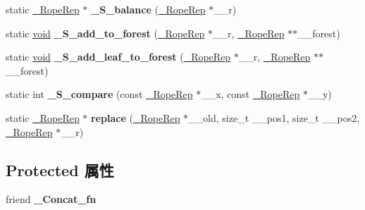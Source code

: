 \begin{DoxyCompactItemize}
\item 
\mbox{\label{classrope_a8bd6a43d37132875ab5318828aac92ee}} 
static \hyperlink{struct___rope___rope_rep}{\+\_\+\+Rope\+Rep} $\ast$ {\bfseries \+\_\+\+S\+\_\+balance} (\hyperlink{struct___rope___rope_rep}{\+\_\+\+Rope\+Rep} $\ast$\+\_\+\+\_\+r)
\item 
\mbox{\label{classrope_afdc31aa8c4716991358e17e7308dadad}} 
static \hyperlink{interfacevoid}{void} {\bfseries \+\_\+\+S\+\_\+add\+\_\+to\+\_\+forest} (\hyperlink{struct___rope___rope_rep}{\+\_\+\+Rope\+Rep} $\ast$\+\_\+\+\_\+r, \hyperlink{struct___rope___rope_rep}{\+\_\+\+Rope\+Rep} $\ast$$\ast$\+\_\+\+\_\+forest)
\item 
\mbox{\label{classrope_ac3317f231f99b11f1a464b59b9192ac0}} 
static \hyperlink{interfacevoid}{void} {\bfseries \+\_\+\+S\+\_\+add\+\_\+leaf\+\_\+to\+\_\+forest} (\hyperlink{struct___rope___rope_rep}{\+\_\+\+Rope\+Rep} $\ast$\+\_\+\+\_\+r, \hyperlink{struct___rope___rope_rep}{\+\_\+\+Rope\+Rep} $\ast$$\ast$\+\_\+\+\_\+forest)
\item 
\mbox{\label{classrope_a34814f1774f9aaa22c8003fe580ab6af}} 
static int {\bfseries \+\_\+\+S\+\_\+compare} (const \hyperlink{struct___rope___rope_rep}{\+\_\+\+Rope\+Rep} $\ast$\+\_\+\+\_\+x, const \hyperlink{struct___rope___rope_rep}{\+\_\+\+Rope\+Rep} $\ast$\+\_\+\+\_\+y)
\item 
\mbox{\label{classrope_a1ee0e1651f825baaa50c4eaed2fc7238}} 
static \hyperlink{struct___rope___rope_rep}{\+\_\+\+Rope\+Rep} $\ast$ {\bfseries replace} (\hyperlink{struct___rope___rope_rep}{\+\_\+\+Rope\+Rep} $\ast$\+\_\+\+\_\+old, size\+\_\+t \+\_\+\+\_\+pos1, size\+\_\+t \+\_\+\+\_\+pos2, \hyperlink{struct___rope___rope_rep}{\+\_\+\+Rope\+Rep} $\ast$\+\_\+\+\_\+r)
\end{DoxyCompactItemize}
\subsection*{Protected 属性}
\begin{DoxyCompactItemize}
\item 
\mbox{\label{classrope_a29da1781f5d475716a48b919dbf43ccd}} 
friend {\bfseries \+\_\+\+Concat\+\_\+fn}
\end{DoxyCompactItemize}
